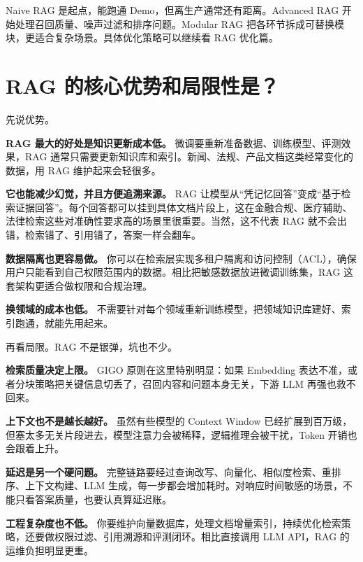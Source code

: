 \documentclass[10pt,a4paper]{ctexart}
\begin{document}
Naive RAG 是起点，能跑通 Demo，但离生产通常还有距离。Advanced RAG 开始处理召回质量、噪声过滤和排序问题。Modular RAG 把各环节拆成可替换模块，更适合复杂场景。具体优化策略可以继续看 RAG 优化篇。



\section{RAG 的核心优势和局限性是？}


先说优势。



\textbf{RAG 最大的好处是知识更新成本低。} 微调要重新准备数据、训练模型、评测效果，RAG 通常只需要更新知识库和索引。新闻、法规、产品文档这类经常变化的数据，用 RAG 维护起来会轻很多。



\textbf{它也能减少幻觉，并且方便追溯来源。} RAG 让模型从“凭记忆回答”变成“基于检索证据回答”。每个回答都可以挂到具体文档片段上，这在金融合规、医疗辅助、法律检索这些对准确性要求高的场景里很重要。当然，这不代表 RAG 就不会出错，检索错了、引用错了，答案一样会翻车。



\textbf{数据隔离也更容易做。} 你可以在检索层实现多租户隔离和访问控制（ACL），确保用户只能看到自己权限范围内的数据。相比把敏感数据放进微调训练集，RAG 这套架构更适合做权限和合规治理。



\textbf{换领域的成本也低。} 不需要针对每个领域重新训练模型，把领域知识库建好、索引跑通，就能先用起来。



再看局限。RAG 不是银弹，坑也不少。



\textbf{检索质量决定上限。} GIGO 原则在这里特别明显：如果 Embedding 表达不准，或者分块策略把关键信息切丢了，召回内容和问题本身无关，下游 LLM 再强也救不回来。



\textbf{上下文也不是越长越好。} 虽然有些模型的 Context Window 已经扩展到百万级，但塞太多无关片段进去，模型注意力会被稀释，逻辑推理会被干扰，Token 开销也会跟着上升。



\textbf{延迟是另一个硬问题。} 完整链路要经过查询改写、向量化、相似度检索、重排序、上下文构建、LLM 生成，每一步都会增加耗时。对响应时间敏感的场景，不能只看答案质量，也要认真算延迟账。



\textbf{工程复杂度也不低。} 你要维护向量数据库，处理文档增量索引，持续优化检索策略，还要做权限过滤、引用溯源和评测闭环。相比直接调用 LLM API，RAG 的运维负担明显更重。
\end{document}
